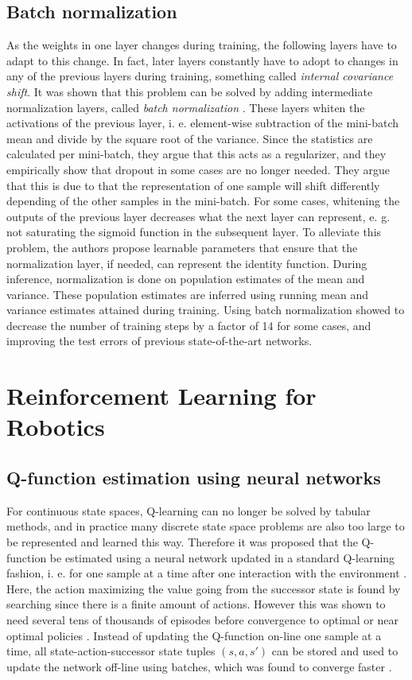 \subsection{Batch normalization}

As the weights in one layer changes during training, the following layers have
to adapt to this change. In fact, later layers constantly have to adopt to
changes in any of the previous layers during training, something called
\textit{internal covariance shift}. It was shown that this problem can be
solved by adding intermediate normalization layers, called \textit{batch
normalization} \cite{ioffe2015batch}. These layers whiten the activations of
the previous layer, i. e. element-wise subtraction of the mini-batch mean and
divide by the square root of the variance. Since the statistics are calculated
per mini-batch, they argue that this acts as a regularizer, and they
empirically show that dropout in some cases are no longer needed. They argue
that this is due to that the representation of one sample will shift
differently depending of the other samples in the mini-batch. For some cases,
whitening the outputs of the previous layer decreases what the next layer can
represent, e. g. not saturating the sigmoid function in the subsequent layer.
To alleviate this problem, the authors propose learnable parameters that ensure
that the normalization layer, if needed, can represent the identity function.
During inference, normalization is done on population estimates of the mean and
variance. These population estimates are inferred using running mean and
variance estimates attained during training. Using batch normalization showed
to decrease the number of training steps by a factor of 14 for some cases, and
improving the test errors of previous state-of-the-art networks.

\section{Reinforcement Learning for Robotics}

\subsection{Q-function estimation using neural networks}

For continuous state spaces, Q-learning can no longer be solved by tabular
methods, and in practice many discrete state space problems are also too large
to be represented and learned this way. Therefore it was proposed that the
Q-function be estimated using a neural network updated in a standard Q-learning
fashion, i. e. for one sample at a time after one interaction with the
environment \cite{riedmiller1999concepts}. Here, the action maximizing the
value going from the successor state is found by searching since there is a
finite amount of actions. However this was shown to need several tens of
thousands of episodes before convergence to optimal or near optimal policies
\cite{riedmiller1999concepts}. Instead of updating the Q-function on-line one
sample at a time, all state-action-successor state tuples $(s, a, s')$ can be
stored and used to update the network off-line using batches, which was found
to converge faster \cite{riedmiller2005neural}.


